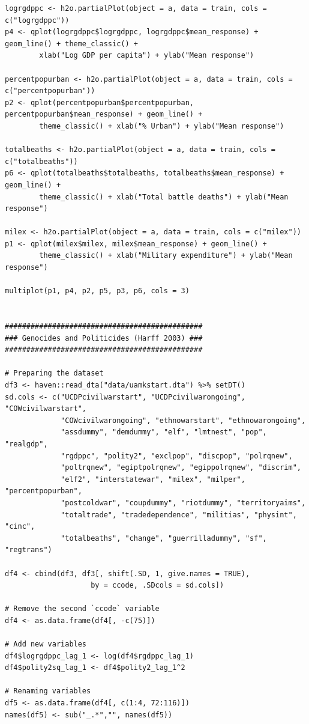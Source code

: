 \begin{verbatim}
logrgdppc <- h2o.partialPlot(object = a, data = train, cols = c("logrgdppc"))
p4 <- qplot(logrgdppc$logrgdppc, logrgdppc$mean_response) + geom_line() + theme_classic() +
        xlab("Log GDP per capita") + ylab("Mean response")

percentpopurban <- h2o.partialPlot(object = a, data = train, cols = c("percentpopurban"))
p2 <- qplot(percentpopurban$percentpopurban, percentpopurban$mean_response) + geom_line() +
        theme_classic() + xlab("% Urban") + ylab("Mean response")

totalbeaths <- h2o.partialPlot(object = a, data = train, cols = c("totalbeaths"))
p6 <- qplot(totalbeaths$totalbeaths, totalbeaths$mean_response) + geom_line() +
        theme_classic() + xlab("Total battle deaths") + ylab("Mean response")

milex <- h2o.partialPlot(object = a, data = train, cols = c("milex"))
p1 <- qplot(milex$milex, milex$mean_response) + geom_line() +
        theme_classic() + xlab("Military expenditure") + ylab("Mean response")

multiplot(p1, p4, p2, p5, p3, p6, cols = 3)


##############################################
### Genocides and Politicides (Harff 2003) ###
##############################################

# Preparing the dataset
df3 <- haven::read_dta("data/uamkstart.dta") %>% setDT()
sd.cols <- c("UCDPcivilwarstart", "UCDPcivilwarongoing", "COWcivilwarstart",
             "COWcivilwarongoing", "ethnowarstart", "ethnowarongoing",
             "assdummy", "demdummy", "elf", "lmtnest", "pop", "realgdp",
             "rgdppc", "polity2", "exclpop", "discpop", "polrqnew",
             "poltrqnew", "egiptpolrqnew", "egippolrqnew", "discrim",
             "elf2", "interstatewar", "milex", "milper", "percentpopurban",
             "postcoldwar", "coupdummy", "riotdummy", "territoryaims",
             "totaltrade", "tradedependence", "militias", "physint", "cinc",
             "totalbeaths", "change", "guerrilladummy", "sf", "regtrans")

df4 <- cbind(df3, df3[, shift(.SD, 1, give.names = TRUE),
                    by = ccode, .SDcols = sd.cols]) 

# Remove the second `ccode` variable
df4 <- as.data.frame(df4[, -c(75)])

# Add new variables
df4$logrgdppc_lag_1 <- log(df4$rgdppc_lag_1)
df4$polity2sq_lag_1 <- df4$polity2_lag_1^2

# Renaming variables
df5 <- as.data.frame(df4[, c(1:4, 72:116)])
names(df5) <- sub("_.*","", names(df5)) 


\end{verbatim}
